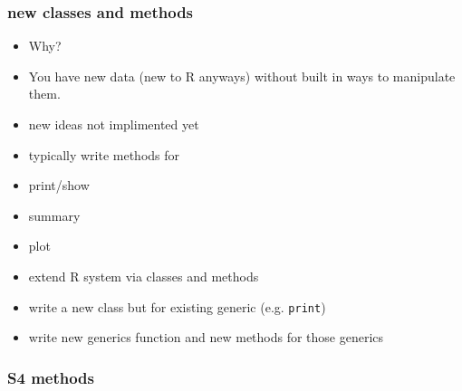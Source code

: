 \documentclass[11pt]{article}
\begin{document}
\subsubsection{new classes and methods}
\label{sec-4-3-8}

\begin{itemize}
\item Why?
\item You have new data (new to R anyways) without built in ways to manipulate them.
\item new ideas not implimented yet
\item typically write methods for
\item print/show
\item summary
\item plot
\item extend R system via classes and methods
\item write a new class but for existing generic (e.g. \texttt{print})
\item write new generics function and new methods for those generics
\end{itemize}
\subsubsection{S4 methods}
\label{sec-4-3-9}
\end{document}
